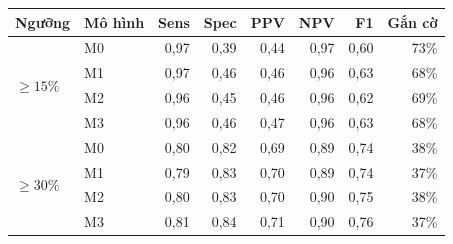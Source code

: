 \begin{tabular}{@{}llrrrrrr@{}}
\toprule
Ngưỡng & Mô hình & Sens & Spec & PPV & NPV & F1 & Gắn cờ\\
\midrule
\multirow{4}{*}{$\geq 15\%$} & M0 & 0,97 & 0,39 & 0,44 & 0,97 & 0,60 & 73\%\\
 & M1 & 0,97 & 0,46 & 0,46 & 0,96 & 0,63 & 68\%\\
 & M2 & 0,96 & 0,45 & 0,46 & 0,96 & 0,62 & 69\%\\
 & M3 & 0,96 & 0,46 & 0,47 & 0,96 & 0,63 & 68\%\\
\midrule
\multirow{4}{*}{$\geq 30\%$} & M0 & 0,80 & 0,82 & 0,69 & 0,89 & 0,74 & 38\%\\
 & M1 & 0,79 & 0,83 & 0,70 & 0,89 & 0,74 & 37\%\\
 & M2 & 0,80 & 0,83 & 0,70 & 0,90 & 0,75 & 38\%\\
 & M3 & 0,81 & 0,84 & 0,71 & 0,90 & 0,76 & 37\%\\
\bottomrule
\end{tabular}
